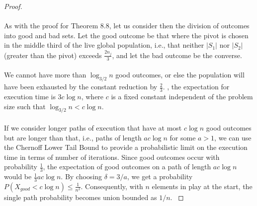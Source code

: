 \documentclass[11pt,epsf]{article}
\begin{document}
{{\begin{proof}
      \paragraph{}{
        As with the proof for Theorem 8.8\autocite[168-169]{ALG}, let us consider then
        the division of outcomes into good and bad sets. Let the good outcome be that
        where the pivot is chosen in the middle third of the live global population, i.e.,
        that neither $|S_1|$ nor $|S_2|$ (greater than the pivot) exceeds $\frac{2n_j}{3}$,
        and let the bad outcome be the converse.
      }
      \paragraph{}{
        We cannot have more than $\log_{3/2} n$ good outcomes, or else the population will
        have been exhausted by the constant reduction by $\frac{2}{3}$. , the expectation for execution time is $3c\log n$,
        where $c$ is a fixed constant independent of the problem size such that
        $\log_{3/2} n < c \log n$.
      }
      \paragraph{}{
        If we consider longer paths of execution that have at most $c \log n$ good outcomes
        but are longer than that, i.e., paths of length $ac \log n$ for some $a > 1$, we can
        use the Chernoff Lower Tail Bound\autocite[323]{ALG} to provide a probabilistic
        limit on the execution time in terms of number of iterations.
        Since good outcomes occur with probability $\frac{1}{3}$, the expectation of good
        outcomes on a path of length $ac \log n$ would be $\frac{1}{3}ac \log n$.
        By choosing $\delta = 3/a$, we get a probability $P(X_{good} < c \log n) \leq \frac{1}{n^2}$.
        Consequently, with $n$ elements in play at the start, the single
        path probability becomes union bounded as $1/n$\autocite[169]{ALG}.
      }

\end{proof}}}
\end{document}

